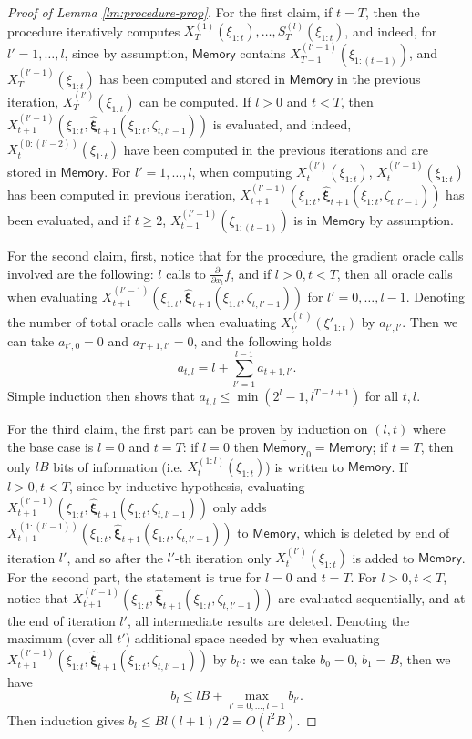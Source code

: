 \documentclass[11pt,fullpage,letterpaper]{article}
\newcommand{\bx}{\boldsymbol{\xi}}
\newcommand{\memo}{\mathsf{Memory}}
\begin{document}
\begin{proof}[Proof of Lemma \ref{lm:procedure-prop}]
For the first claim, if $t=  T$, then the procedure iteratively computes $X_T^{(1)}(\xi_{1:t}),\ldots,S_T^{(l)}(\xi_{1:t})$, and indeed, for $l'=1,\ldots,l$, since by assumption, $\memo$ contains $X_{T-1}^{(l'-1)}(\xi_{1:(t-1)})$, and $X_T^{(l'-1)}(\xi_{1:t})$ has been computed and stored in $\memo$ in the previous iteration, $X_T^{(l')}(\xi_{1:t})$ can be computed. If $l>0$ and $t<T$, then $X_{t+1}^{(l'-1)}(\xi_{1:t},\widehat{\bx}_{t+1}(\xi_{1:t},\zeta_{t,l'-1}))$ is evaluated, and indeed, $X_{t}^{(0:(l'-2))}(\xi_{1:t})$ have been computed in the previous iterations and are stored in $\memo$. For $l'=1,\ldots,l$, when computing $X_t^{(l')}(\xi_{1:t})$, ${X}_t^{(l'-1)}(\xi_{1:t})$ has been computed in previous iteration, $X_{t+1}^{(l'-1)}(\xi_{1:t},\widehat{\bx}_{t+1}(\xi_{1:t},\zeta_{t,l'-1}))$ has been evaluated, and if $t\geq 2$, $X_{t-1}^{(l'-1)}(\xi_{1:(t-1)})$ is in $\memo$ by assumption.




For the second claim, first, notice that for the procedure, the gradient oracle calls involved are the following: $l$ calls to $\frac{\partial}{\partial x_t}f$, and if $l>0,t<T$, then all oracle calls when evaluating $X_{t+1}^{(l'-1)}(\xi_{1:t},\widehat{\bx}_{t+1}(\xi_{1:t},\zeta_{t,l'-1}))$ for $l'=0,\ldots,l-1$. Denoting the number of total oracle calls when evaluating $X_{t'}^{(l')}(\xi'_{1:t})$ by $a_{t',l'}$. Then we can take $a_{t',0}=0$ and $a_{T+1,l'}=0$, and the following holds 
\begin{displaymath}
    a_{t,l} = l + \sum_{l'=1}^{l-1} a_{t+1,l'}.
\end{displaymath}
Simple induction then shows that $a_{t,l}\leq \min(2^l-1,l^{T-t+1})$ for all $t,l$.

For the third claim, the first part can be proven by induction on $(l,t)$ where the base case is $l=0$ and $t = T$: if $l=0$ then $\overline{\memo}_0 = \memo$; if $t=T$, then only $lB$ bits of information (i.e. $X_t^{(1:l)}(\xi_{1:t})$) is written to $\memo$. If $l>0,t<T$, since by inductive hypothesis, evaluating $X_{t+1}^{(l'-1)}(\xi_{1:t},\widehat{\bx}_{t+1}(\xi_{1:t},\zeta_{t,l'-1}))$ only adds $X_{t+1}^{(1:(l'-1))}(\xi_{1:t},\widehat{\bx}_{t+1}(\xi_{1:t},\zeta_{t,l'-1}))$ to $\memo$, which is deleted by end of iteration $l'$, and so after the $l'$-th iteration only $X_t^{(l')}(\xi_{1:t})$ is added to $\memo$. For the second part, the statement is true for $l=0$ and $t = T$. For $l>0,t<T$, notice that $X_{t+1}^{(l'-1)}(\xi_{1:t},\widehat{\bx}_{t+1}(\xi_{1:t},\zeta_{t,l'-1}))$ are evaluated sequentially, and at the end of iteration $l'$, all intermediate results are deleted. Denoting the maximum (over all $t'$) additional space needed by when evaluating $X_{t+1}^{(l'-1)}(\xi_{1:t},\widehat{\bx}_{t+1}(\xi_{1:t},\zeta_{t,l'-1}))$ by $b_{l'}$: we can take $b_0 =0$, $b_1 = B$, then we have 
\begin{displaymath}
    b_{l}\leq l B + \max_{l'=0,\ldots, l-1} b_{l'}.
\end{displaymath}
Then induction gives $b_l\leq Bl(l+1)/2 = O(l^2B)$. 
\end{proof}
\end{document}

